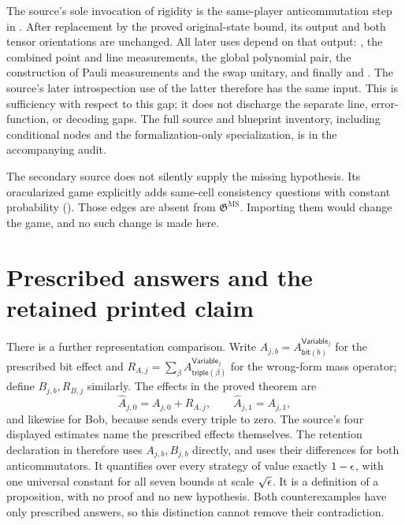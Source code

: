 \documentclass[11pt]{article}
\newcommand{\game}{\mathfrak{G}}
\newcommand{\MS}{\mathrm{MS}}
\newcommand{\Variable}{\mathsf{Variable}}
\begin{document}
The source's sole invocation of rigidity is the same-player anticommutation
step in . After replacement by the proved
original-state bound, its output and both tensor orientations are unchanged.
All later uses depend on that output: , the combined
point and line measurements, the global polynomial pair, the construction of
Pauli measurements and the swap unitary, and finally  and
. The source's later introspection use of the latter
therefore has the same input. This is sufficiency with respect to this gap;
it does not discharge the separate line, error-function, or decoding gaps.
The full source and blueprint inventory, including conditional nodes and
the formalization-only specialization, is in the accompanying audit.

The secondary source does not silently supply the missing hypothesis. Its
oracularized game explicitly adds same-cell consistency questions with
constant probability
().
Those edges are absent from $\game^{\MS}$. Importing them would change the
game, and no such change is made here.

\section{Prescribed answers and the retained printed claim}
\label{sec:prescribed}

There is a further representation comparison. Write
$A_{j,b}=A^{\Variable_j}_{\mathsf{bit}(b)}$ for the prescribed bit effect and
$R_{A,j}=\sum_\beta A^{\Variable_j}_{\mathsf{triple}(\beta)}$ for the
wrong-form mass operator; define $B_{j,b},R_{B,j}$ similarly. The effects in
the proved theorem are
\[
  \hat A_{j,0}=A_{j,0}+R_{A,j},\qquad
  \hat A_{j,1}=A_{j,1},
\]
and likewise for Bob, because  sends every triple to zero.
The source's four displayed estimates name the prescribed effects themselves.
The retention declaration
 in
therefore uses $A_{j,b},B_{j,b}$ directly, and uses their differences for both
anticommutators. It quantifies over every strategy of value exactly $1-\epsilon$,
with one universal constant for all seven bounds at scale $\sqrt{\epsilon}$.
It is a definition of a proposition, with no proof and no new hypothesis.
Both counterexamples have only prescribed answers, so this distinction cannot
remove their contradiction.
\end{document}
